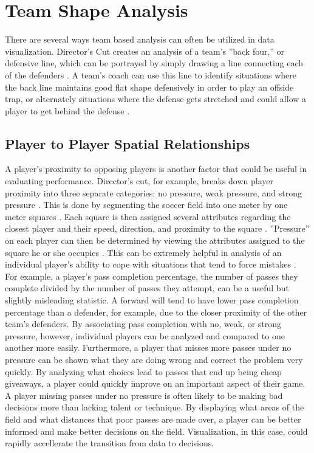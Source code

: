 \documentclass[sigconf]{acmart}
\begin{document}
\section{Team Shape Analysis}

There are several ways team based analysis can often be utilized in data visualization. Director’s Cut creates an analysis of a team’s ''back four,'' or defensive line, which can be portrayed by simply drawing a line connecting each of the defenders \cite{directorscut}. A team’s coach can use this line to identify situations where the back line maintains good flat shape defensively in order to play an offside trap, or alternately situations where the defense gets stretched and could allow a player to get behind the defense \cite{directorscut}.

\subsection{Player to Player Spatial Relationships}

A player’s proximity to opposing players is another factor that could be useful in evaluating performance. Director’s cut, for example, breaks down player proximity into three separate categories: no pressure, weak pressure, and strong pressure \cite{directorscut}. This is done by segmenting the soccer field into one meter by one meter squares \cite{directorscut}. Each square is then assigned several attributes regarding the closest player and their speed, direction, and proximity to the square \cite{directorscut}. ''Pressure'' on each player can then be determined by viewing the attributes assigned to the square he or she occupies \cite{directorscut}. This can be extremely helpful in analysis of an individual player’s ability to cope with situations that tend to force mistakes \cite{directorscut}. For example, a player’s pass completion percentage, the number of passes they complete divided by the number of passes they attempt, can be a useful but slightly misleading statistic. A forward will tend to have lower pass completion percentage than a defender, for example, due to the closer proximity of the other team’s defenders. By associating pass completion with no, weak, or strong pressure, however, individual players can be analyzed and compared to one another more easily. Furthermore, a player that misses more passes under no pressure can be shown what they are doing wrong and correct the problem very quickly. By analyzing what choices lead to passes that end up being cheap giveaways, a player could quickly improve on an important aspect of their game. A player missing passes under no pressure is often likely to be making bad decisions more than lacking talent or technique. By displaying what areas of the field and what distances that poor passes are made over, a player can be better informed and make better decisions on the field. Visualization, in this case, could rapidly accellerate the transition from data to decisions.
\end{document}

